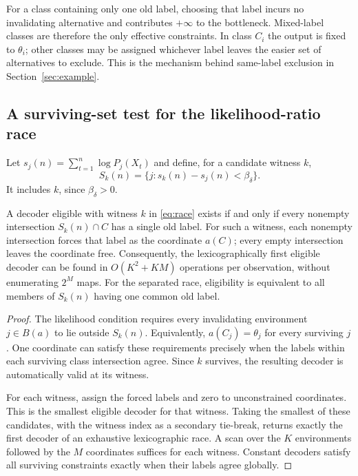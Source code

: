 For a class containing only one old label, choosing that label incurs no
invalidating alternative and contributes $+\infty$ to the bottleneck.
Mixed-label classes are therefore the only effective constraints. In class
$C_i$ the output is fixed to $\theta_i$; other classes may be assigned whichever
label leaves the easier set of alternatives to exclude. This is the mechanism
behind same-label exclusion in Section~\ref{sec:example}.

\subsection{A surviving-set test for the likelihood-ratio race}
Let $s_j(n)=\sum_{t=1}^n\log P_j(X_t)$ and define, for a candidate witness $k$,
\[
S_k(n)=\{j:s_k(n)-s_j(n)<\beta_\delta\}.
\]
It includes $k$, since $\beta_\delta>0$.

\begin{theorem}
\label{thm:polynomial}
A decoder eligible with witness $k$ in \eqref{eq:race} exists if and only if
every nonempty intersection $S_k(n)\cap C$ has a single old label.
For such a witness, each nonempty intersection forces that label as the
coordinate $a(C)$; every empty intersection leaves the coordinate free.
Consequently, the lexicographically first eligible decoder can be found in
$O(K^2+KM)$ operations per observation, without enumerating $2^M$ maps.
For the separated race, eligibility is equivalent to all members of $S_k(n)$
having one common old label.
\end{theorem}
\begin{proof}
The likelihood condition requires every invalidating environment $j\in B(a)$
to lie outside $S_k(n)$. Equivalently, $a(C_j)=\theta_j$ for every surviving
$j$. One coordinate can satisfy these requirements precisely when the labels
within each surviving class intersection agree. Since $k$ survives, the
resulting decoder is automatically valid at its witness.

For each witness, assign the forced labels and zero to unconstrained
coordinates. This is the smallest eligible decoder for that witness. Taking
the smallest of these candidates, with the witness index as a secondary
tie-break, returns exactly the first decoder of an exhaustive lexicographic
race. A scan over the $K$ environments followed by the $M$ coordinates
suffices for each witness. Constant decoders satisfy all surviving constraints
exactly when their labels agree globally.
\end{proof}

